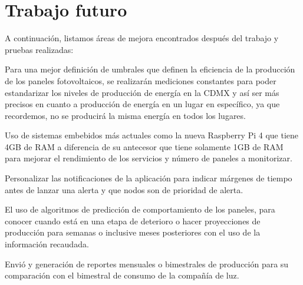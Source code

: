 \chapter{Trabajo futuro}\label{chapter7}

\newline A continuación, listamos áreas de mejora encontrados después del trabajo y pruebas realizadas:

\newline Para una mejor definición de umbrales que definen la eficiencia de la producción de los paneles fotovoltaicos, se realizarán mediciones constantes para poder estandarizar los niveles de producción de energía en la CDMX y así ser más precisos en cuanto a producción de energía en un lugar en específico, ya que recordemos, no se producirá la misma energía en todos los lugares. 

\newline Uso de sistemas embebidos más actuales como la nueva Raspberry Pi 4 que tiene 4GB de RAM a diferencia de su antecesor que tiene solamente 1GB de RAM  para mejorar el rendimiento de los servicios y número de paneles a monitorizar.

\newline Personalizar las notificaciones de la aplicación para indicar márgenes de tiempo antes de lanzar una alerta y que nodos son de prioridad de alerta.

\newline El uso de algoritmos de predicción de comportamiento de los paneles, para conocer cuando está en una etapa de deterioro o hacer proyecciones de producción para semanas o inclusive meses posteriores con el uso de la información recaudada.

\newline Envió y generación de reportes mensuales o bimestrales de producción para su comparación con el bimestral de consumo de la compañía de luz. 